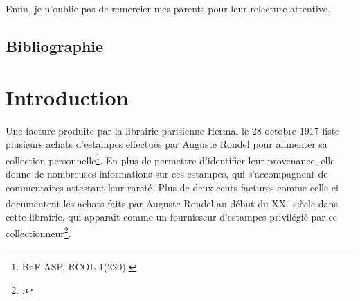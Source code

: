 \documentclass[12pt,twoside]{book}
\begin{document}
Enfin, je n'oublie pas de remercier mes parents pour leur relecture attentive. 

	\newpage{\pagestyle{empty}\cleardoublepage}

\section*{Bibliographie}
\nocite{*} %
\printbibliography[heading=bnf, keyword=asp]
\printbibliography[heading=livre, keyword=livre]
\printbibliography[heading=donnees,keyword=donnees]
\printbibliography[heading=heurist, keyword=heurist]
\printbibliography[heading=IA, keyword=IA]
\printbibliography[heading=sources, keyword=sources]


\chapter{Introduction}	


Une facture produite par la librairie parisienne Hermal le 28 octobre 1917 liste plusieurs achats d'estampes effectués par Auguste Rondel pour alimenter sa collection personnelle\footnote{BnF ASP, RCOL-1(220).}. En plus de permettre d'identifier leur provenance, elle donne de nombreuses informations sur ces estampes, qui s'accompagnent de commentaires attestant leur rareté. Plus de deux cents factures comme celle-ci documentent les achats faits par Auguste Rondel au début du XX\textsuperscript{e} siècle dans cette librairie, qui apparaît comme un fournisseur d'estampes privilégié par ce collectionneur\footcite{godard_2022}.
\end{document}

